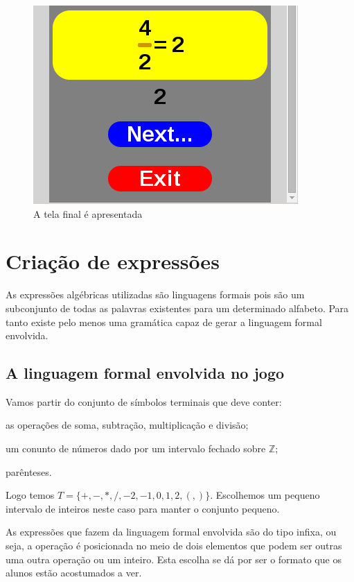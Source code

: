 \begin{figure}[H]
	\caption{\label{xp_11}A tela final é apresentada}
	\begin{center}
	    \includegraphics[scale=1]{xp_4_11.png}
	\end{center}
\end{figure}

\chapter{Criação de expressões}

As expressões algébricas utilizadas são linguagens formais pois são um subconjunto de todas as palavras existentes para um determinado alfabeto. Para tanto existe pelo menos uma gramática capaz de gerar a linguagem formal envolvida.

\section{A linguagem formal envolvida no jogo}
Vamos partir do conjunto de símbolos terminais que deve conter:

\begin{alineas}
\item as operações de soma, subtração, multiplicação e divisão;
\item um conunto de números dado por um intervalo fechado sobre $\mathbb{Z}$; 
\item parênteses.
\end{alineas}

Logo temos $T = \{+, -, *, /, -2, -1, 0, 1, 2, (, )\}$. Escolhemos um pequeno intervalo de inteiros neste caso para manter o conjunto pequeno.

	As expressões que fazem da linguagem formal envolvida são do tipo infixa, ou seja, a operação é posicionada no meio de dois elementos que podem ser outras uma outra operação ou um inteiro. Esta escolha se dá por ser o formato que os alunos estão acostumados a ver.
	
